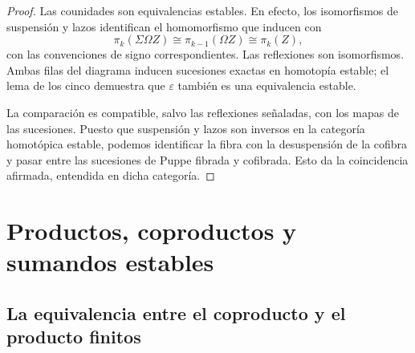 \begin{proof}
Las counidades son equivalencias estables. En efecto, los isomorfismos de suspensión y lazos identifican el homomorfismo que inducen con
\[
\pi_k(\Sigma\Omega Z)\cong\pi_{k-1}(\Omega Z)\cong\pi_k(Z),
\]
con las convenciones de signo correspondientes. Las reflexiones son isomorfismos. Ambas filas del diagrama inducen sucesiones exactas en homotopía estable; el lema de los cinco demuestra que $\varepsilon$ también es una equivalencia estable.

La comparación es compatible, salvo las reflexiones señaladas, con los mapas de las sucesiones. Puesto que suspensión y lazos son inversos en la categoría homotópica estable, podemos identificar la fibra con la desuspensión de la cofibra y pasar entre las sucesiones de Puppe fibrada y cofibrada. Esto da la coincidencia afirmada, entendida en dicha categoría.
\end{proof}

\section{Productos, coproductos y sumandos estables}

\subsection{La equivalencia entre el coproducto y el producto finitos}

